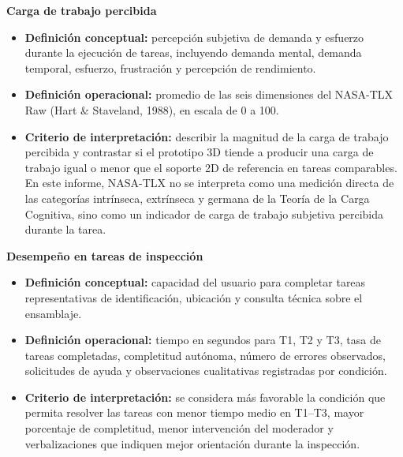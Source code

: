 \textbf{Carga de trabajo percibida}
\begin{itemize}
    \item \textbf{Definición conceptual:} percepción subjetiva de demanda y esfuerzo durante la ejecución de tareas, incluyendo demanda mental, demanda temporal, esfuerzo, frustración y percepción de rendimiento.
    \item \textbf{Definición operacional:} promedio de las seis dimensiones del NASA-TLX Raw (Hart \& Staveland, 1988), en escala de 0 a 100.
    \item \textbf{Criterio de interpretación:} describir la magnitud de la carga de trabajo percibida y contrastar si el prototipo 3D tiende a producir una carga de trabajo igual o menor que el soporte 2D de referencia en tareas comparables. En este informe, NASA-TLX no se interpreta como una medición directa de las categorías intrínseca, extrínseca y germana de la Teoría de la Carga Cognitiva, sino como un indicador de carga de trabajo subjetiva percibida durante la tarea.
\end{itemize}

\textbf{Desempeño en tareas de inspección}
\begin{itemize}
    \item \textbf{Definición conceptual:} capacidad del usuario para completar tareas representativas de identificación, ubicación y consulta técnica sobre el ensamblaje.
    \item \textbf{Definición operacional:} tiempo en segundos para T1, T2 y T3, tasa de tareas completadas, completitud autónoma, número de errores observados, solicitudes de ayuda y observaciones cualitativas registradas por condición.
    \item \textbf{Criterio de interpretación:} se considera más favorable la condición que permita resolver las tareas con menor tiempo medio en T1--T3, mayor porcentaje de completitud, menor intervención del moderador y verbalizaciones que indiquen mejor orientación durante la inspección.
\end{itemize}

